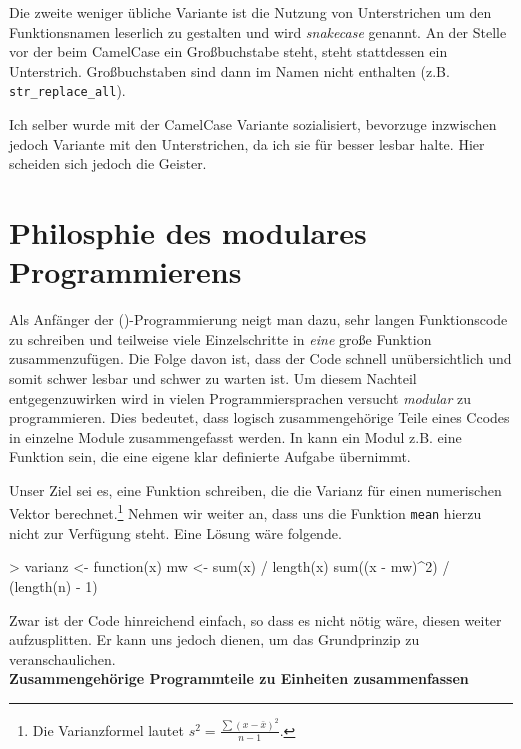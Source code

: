 \documentclass[12pt, a4paper,twoside,openany,x11names,svgnames]{memoir}
\begin{document}
Die zweite weniger übliche Variante ist die Nutzung von Unterstrichen um den Funktionsnamen leserlich zu gestalten und wird \emph{snake\textunderscore{}case} genannt. An der Stelle vor der beim CamelCase ein Großbuchstabe steht, steht stattdessen ein Unterstrich. Großbuchstaben sind dann im Namen nicht enthalten (z.B. \verb+str_replace_all+).

Ich selber wurde mit der CamelCase Variante sozialisiert, bevorzuge inzwischen jedoch Variante mit den Unterstrichen, da ich sie für besser lesbar halte. Hier scheiden sich jedoch die Geister. 



\section{Philosphie des modulares Programmierens}

Als Anfänger der (\R{})-Programmierung neigt man dazu, sehr langen Funktionscode zu schreiben und teilweise viele Einzelschritte in \emph{eine} große Funktion zusammenzufügen. Die Folge davon ist, dass der Code schnell unübersichtlich und somit schwer lesbar und schwer zu warten ist. Um diesem Nachteil entgegenzuwirken wird in vielen Programmiersprachen versucht \emph{modular} zu programmieren. Dies bedeutet, dass logisch zusammengehörige Teile eines Ccodes in einzelne Module zusammengefasst werden. In \R{} kann ein Modul z.B. eine Funktion sein, die eine eigene klar definierte Aufgabe übernimmt.

Unser Ziel sei es, eine Funktion schreiben, die die Varianz für einen numerischen Vektor berechnet.\footnote{Die Varianzformel lautet $s^2=\frac{\sum (x-\bar x)^2}{n-1}$.} Nehmen wir weiter an, dass uns die Funktion \texttt{mean} hierzu nicht zur Verfügung steht. Eine Lösung wäre folgende.

\begin{Schunk}
\begin{Sinput}
> varianz <- function(x) {
   mw <- sum(x) / length(x)
   sum((x - mw)^2) / (length(n) - 1)
 }
\end{Sinput}
\end{Schunk}

Zwar ist der Code hinreichend einfach, so dass es nicht nötig wäre, diesen weiter aufzusplitten. Er kann uns jedoch dienen, um das Grundprinzip zu veranschaulichen. 
\\

\textbf{Zusammengehörige Programmteile zu Einheiten zusammenfassen}
\end{document}
